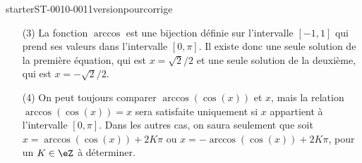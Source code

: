 
\begin{corrige}{starterST-0010-0011versionpourcorrige}
  \begin{enumerate}
  \item[(3)] La fonction $\arccos$ est une bijection définie sur l'intervalle $[-1,1]$ qui prend ses valeurs dans l'intervalle $\displaystyle \left[0, \pi\right]$. Il existe donc une seule solution de la première équation, qui est $x = \sqrt{2}/2$ et une seule solution de la deuxième,  qui est $x = -\sqrt{2}/2$.
  \item[(4)] On peut toujours comparer $\arccos(\cos (x))$ et $x$, mais la relation $\arccos(\cos (x)) = x$ sera satisfaite uniquement si $x$ appartient à l'intervalle $\displaystyle \left[0, \pi\right]$. Dans les autres cas, on saura seulement que soit $x = \arccos(\cos (x)) + 2K\pi$ ou $x = - \arccos(\cos (x)) + 2K\pi$, pour un $K\in\eZ$ à déterminer. 
  \end{enumerate}
\end{corrige}
